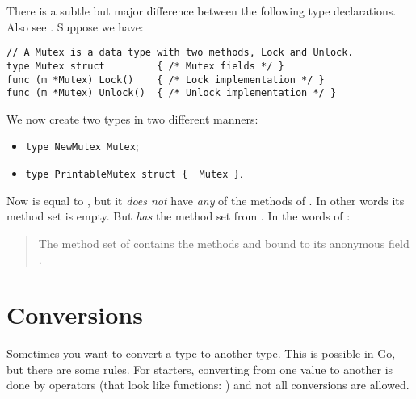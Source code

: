 There is a subtle but major difference between the following type
declarations. Also see \cite[section~``Type Declarations'']{go_spec}.
Suppose we have:
\begin{lstlisting}
// A Mutex is a data type with two methods, Lock and Unlock.
type Mutex struct         { /* Mutex fields */ }
func (m *Mutex) Lock()    { /* Lock implementation */ }
func (m *Mutex) Unlock()  { /* Unlock implementation */ }
\end{lstlisting}
We now create two types in two different manners:
\begin{itemize}
\item \lstinline|type NewMutex Mutex|;
\item \lstinline|type PrintableMutex struct {  Mutex }|.
\end{itemize}
Now  is equal to , but
it \emph{does not} have \emph{any} of the methods of . In other words
its method set is empty.
But  \emph{has}  the 
method set from .
In the words of \cite{go_spec}:
\begin{quote}
The method set of  contains the methods
 and  bound to its anonymous field .
\end{quote}

\section{Conversions}
\label{sec:conversions}
Sometimes you want to convert a type to another type. 
This is possible in Go, but
there are some rules. For starters, converting from one value to another
is done by operators (that look like functions: ) and not all conversions are allowed.

\begin{table}[H]
\begin{center}
\caption[Valid conversions]{Valid conversions, 
\lstinline{float64} works the same as \lstinline{float32}}
\label{tab:convesion}

\end{center}
\end{table}

